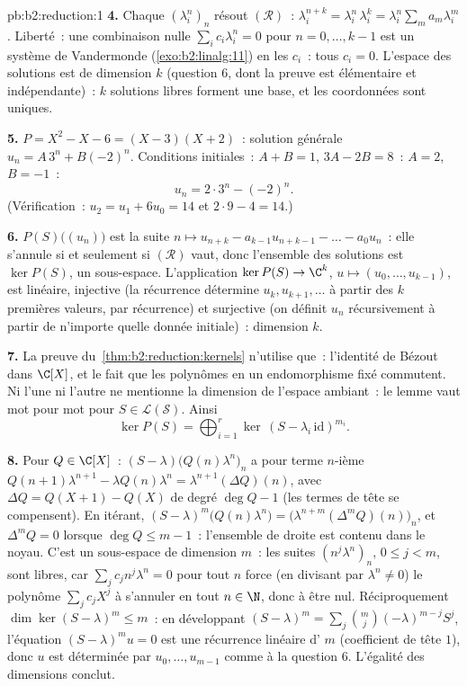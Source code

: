 \begin{solution}{pb:b2:reduction:1}
\textbf{4.} Chaque $(\lambda_i^n)_n$ résout $(\mathcal R)$~:
$\lambda_i^{n+k} = \lambda_i^n\,\lambda_i^k =
\lambda_i^n\sum_m a_m\lambda_i^m$. Liberté~: une combinaison nulle
$\sum_i c_i\lambda_i^n = 0$ pour $n = 0, \dots, k-1$ est un système de
Vandermonde (\cref{exo:b2:linalg:11}) en les $c_i$~: tous $c_i = 0$.
L'espace des solutions est de dimension $k$ (question 6, dont la
preuve est élémentaire et indépendante)~: $k$ solutions libres
forment une base, et les coordonnées sont uniques.

\textbf{5.} $P = X^2 - X - 6 = (X - 3)(X + 2)$~: solution générale
$u_n = A\,3^n + B(-2)^n$. Conditions initiales~: $A + B = 1$, $3A -
2B = 8$~: $A = 2$, $B = -1$~:
\[
u_n = 2\cdot 3^n - (-2)^n .
\]
(Vérification~: $u_2 = u_1 + 6u_0 = 14$ et $2\cdot9 - 4 = 14$.)

\textbf{6.} $P(S)\bigl((u_n)\bigr)$ est la suite $n \mapsto u_{n+k} -
a_{k-1}u_{n+k-1} - \dots - a_0u_n$~: elle s'annule si et seulement si
$(\mathcal R)$ vaut, donc l'ensemble des solutions est $\ker P(S)$, un
sous-espace. L'application $\ker P(S) \to \C^k$, $u \mapsto (u_0,
\dots, u_{k-1})$, est linéaire, injective (la récurrence détermine
$u_{k}, u_{k+1}, \dots$ à partir des $k$ premières valeurs, par
récurrence) et surjective (on définit $u_n$ récursivement à partir de
n'importe quelle donnée initiale)~: dimension $k$.

\textbf{7.} La preuve du~\cref{thm:b2:reduction:kernels} n'utilise
que~: l'identité de Bézout dans $\C[X]$, et le fait que les polynômes
en un endomorphisme fixé commutent. Ni l'une ni l'autre ne mentionne
la dimension de l'espace ambiant~: le lemme vaut mot pour mot pour $S
\in \mathcal{L}(\mathcal{S})$. Ainsi
\[
\ker P(S) = \bigoplus_{i=1}^{r}
\ker\,(S - \lambda_i\,\mathrm{id})^{m_i}.
\]

\textbf{8.} Pour $Q \in \C[X]$~: $(S -
\lambda)\bigl(Q(n)\lambda^n\bigr)_n$ a pour terme $n$-ième
$Q(n{+}1)\lambda^{n+1} - \lambda Q(n)\lambda^n =
\lambda^{n+1}(\Delta Q)(n)$, avec $\Delta Q = Q(X{+}1) - Q(X)$ de
degré $\deg Q - 1$ (les termes de tête se compensent). En itérant,
$(S - \lambda)^m\bigl(Q(n)\lambda^n\bigr) =
\bigl(\lambda^{n+m}(\Delta^m Q)(n)\bigr)_n$, et $\Delta^m Q = 0$
lorsque $\deg Q \leq m - 1$~: l'ensemble de droite est contenu dans le
noyau. C'est un sous-espace de dimension $m$~: les suites
$(n^j\lambda^n)_n$, $0 \leq j < m$, sont libres, car
$\sum_j c_j n^j\lambda^n = 0$ pour tout $n$ force (en divisant par
$\lambda^n \neq 0$) le polynôme $\sum_j c_jX^j$ à s'annuler en tout $n
\in \N$, donc à être nul. Réciproquement $\dim\ker(S - \lambda)^m \leq
m$~: en développant $(S - \lambda)^m = \sum_j
\binom mj(-\lambda)^{m-j}S^j$, l'équation $(S - \lambda)^m u = 0$ est
une récurrence linéaire d' $m$ (coefficient de tête $1$), donc
$u$ est déterminée par $u_0, \dots, u_{m-1}$ comme à la question 6.
L'égalité des dimensions conclut.


\end{solution}
